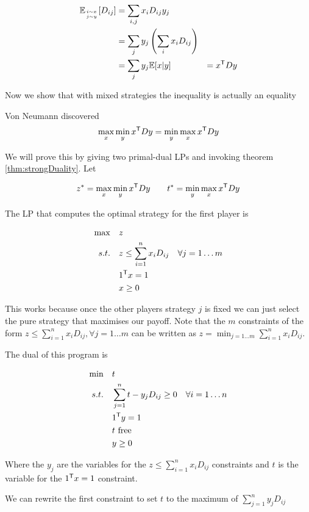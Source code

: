 \begin{align*}
\mathbb{E}_{{i\sim x}\atop {j\sim y}} [D_{ij}] &= \sum_{i,j} x_i D_{ij}y_j\\
	&=\sum_j y_j \left(\sum_i x_iD_{ij}\right)\\
	&=\sum_j y_j \mathbb{E}[x|y]
	&={x}^\text{\upshape \sffamily T} D y
\end{align*}

Now we show that with mixed strategies the inequality is actually an equality

\begin{thm} Von Neumann discovered
\[\max_x\min_y {x}^\text{\upshape \sffamily T}Dy = \min_y\max_x {x}^\text{\upshape \sffamily T} Dy\]
\end{thm}

\begin{pr} We will prove this by giving two primal-dual LPs and invoking theorem \ref{thm:strongDuality}. Let

\[z^* = \max_x \min_y {x}^\text{\upshape \sffamily T} Dy \qquad t^*= \min_y\max_x {x}^\text{\upshape \sffamily T} D y\]

The LP that computes the optimal strategy for the first player is

\begin{align*}
\max \quad & z\\
s.t.\quad & z \leq \sum_{i=1}^n x_i D_{ij} & \forall j=1\ldots m\\
&{1}^\text{\upshape \sffamily T} x = 1\\
&x\geq 0
\end{align*}

This works because once the other players strategy $j$ is fixed we can just select the pure strategy that maximises our payoff. Note that the $m$ constraints of the form $z \leq \sum_{i=1}^n x_i D_{ij}, \forall j=1 \ldots m$ can be written as $z=\min_{j=1\ldots m} \sum_{i=1}^n x_i D_{ij}$.

The dual of this program is

\begin{align*}
\min \quad & t \\
s.t.\quad & \sum_{j=1}^n t-y_jD_{ij}  \geq 0 & \forall i=1\ldots n\\
& {1}^\text{\upshape \sffamily T} y = 1\\
&t \text{ free}\\
&y\geq 0
\end{align*}

Where the $y_j$ are the variables for the $z \leq \sum_{i=1}^n x_i D_{ij}$ constraints and $t$ is the variable for the ${1}^\text{\upshape \sffamily T} x=1$ constraint. 

We can rewrite the first constraint to set $t$ to the maximum of $\sum_{j=1}^n y_jD_{ij}$


\end{pr}
